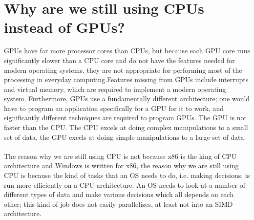 \section{Why are we still using CPUs instead of GPUs?}
GPUs have far more processor cores than CPUs, but because each GPU core runs significantly slower than a CPU core and do not have the features needed for modern operating systems, they are not appropriate for performing most of the processing in everyday computing.Features missing from GPUs include interrupts and virtual memory, which are required to implement a modern operating system. Furthermore, GPUs use a fundamentally different architecture; one would have to program an application specifically for a GPU for it to work, and significantly different techniques are required to program GPUs. The GPU is not faster than the CPU. The CPU excels at doing complex manipulations to a small set of data, the GPU excels at doing simple manipulations to a large set of data.\\\\
The reason why we are still using CPU is not because x86 is the king of CPU architecture and Windows is written for x86, the reason why we are still using CPU is because the kind of tasks that an OS needs to do, i.e. making decisions, is run more efficiently on a CPU architecture. An OS needs to look at a number of different types of data and make various decisions which all depends on each other; this kind of job does not easily parallelizes, at least not into an SIMD architecture.
